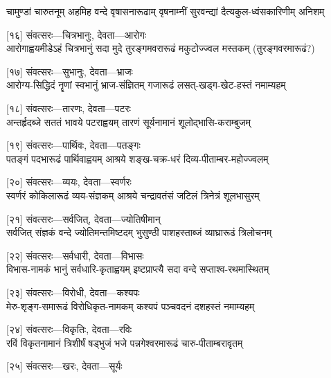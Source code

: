 \twolineshloka
{चामुण्डां चारुतनूम् अहमिह वन्दे वृषासनारूढाम्}
{वृषनाम्नीं सुरवन्द्यां दैत्यकुल-ध्वंसकारिणीम् अनिशम्} %

[१६] संवत्सरः—चित्रभानुः, देवता—आरोगः\\

\twolineshloka
{आरोगाह्वयमीडेऽहं चित्रभानुं सदा मुदे}
{तुरङ्गमवरारूढं मकुटोज्ज्वल मस्तकम्} %
(तुरङ्गवरमारूढं?)

[१७] संवत्सरः—सुभानुः, देवता—भ्राजः\\

\twolineshloka
{आरोग्य-सिद्धिदं नॄणां स्वभानुं भ्राज-संज्ञितम्}
{गजारूढं लसत्-खड्ग-खेट-हस्तं नमाम्यहम्} %

[१८] संवत्सरः—तारणः, देवता—पटरः\\

\twolineshloka
{अन्तर्हृदब्जे सततं भावये पटराह्वयम्}
{तारणं सूर्यनामानं शूलोद्भासि-कराम्बुजम्} %

[१९] संवत्सरः—पार्थिवः, देवता—पतङ्गः\\

\twolineshloka
{पतङ्गं पदभारूढं पार्थिवाह्वयम् आश्रये}
{शङ्ख-चक्र-धरं दिव्य-पीताम्बर-महोज्ज्वलम्} %

[२०] संवत्सरः—व्ययः, देवता—स्वर्णरः\\

\twolineshloka
{स्वर्णरं कोकिलारूढं व्यय-संज्ञकम् आश्रये}
{चन्द्रावतंसं जटिलं त्रिनेत्रं शूलभासुरम्} %

[२१] संवत्सरः—सर्वजित्, देवता—ज्योतिषीमान्\\

\twolineshloka
{सर्वजित् संज्ञकं वन्दे ज्योतिमन्तमिष्टदम्}
{भुसुण्ठी पाशहस्ताब्जं व्याघ्रारूढं त्रिलोचनम्} %

[२२] संवत्सरः—सर्वधारी, देवता—विभासः\\

\twolineshloka
{विभास-नामकं भानुं सर्वधारि-कृताह्वयम्}
{इष्टप्राप्त्यै सदा वन्दे सप्ताश्व-रथमास्थितम्} %

[२३] संवत्सरः—विरोधी, देवता—कश्यपः\\

\twolineshloka
{मेरु-शृङ्ग-समारूढं विरोधिकृत-नामकम्}
{कश्यपं पञ्चवदनं दशहस्तं नमाम्यहम्} %

[२४] संवत्सरः—विकृतिः, देवता—रविः\\

\twolineshloka
{रविं विकृतनामानं त्रिशीर्षं षड्भुजं भजे}
{पन्नगेश्वरमारूढं चारु-पीताम्बरावृतम्} %

[२५] संवत्सरः—खरः, देवता—सूर्यः\\

